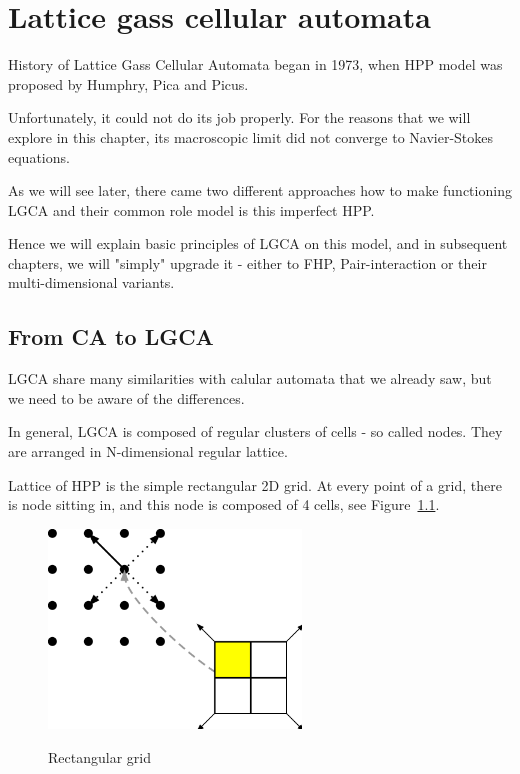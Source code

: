 \chapter{Lattice gass cellular automata}

History of Lattice Gass Cellular Automata began in 1973, when HPP model was proposed by Humphry, Pica and Picus.

Unfortunately, it could not do its job properly. For the reasons that we will explore in this chapter, its macroscopic limit did not converge to Navier-Stokes equations.

\bigskip

As we will see later, there came two different approaches how to make functioning LGCA and their common role model is this imperfect HPP.

Hence we will explain basic principles of LGCA on this model, and in subsequent chapters, we will "simply" upgrade it - either to FHP, Pair-interaction or their multi-dimensional variants.

\section{From CA to LGCA}

LGCA share many similarities with calular automata that we already saw,
but we need to be aware of the differences.

In general, LGCA is composed of regular clusters of cells - so called nodes. They are arranged in N-dimensional regular lattice.

Lattice of HPP is the simple rectangular 2D grid. At every point of a grid, there is node sitting in, and this node is composed of 4 cells, see Figure~\ref{rectangular}.

\begin{figure}[htbp]
 \centering
 \includegraphics[width=0.6\textwidth]{./img/hpp}
 \label{rectangular}
 \caption{Rectangular grid}
\end{figure}

